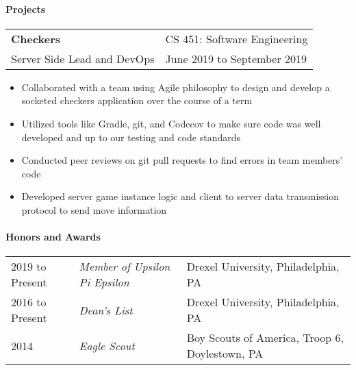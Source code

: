 \documentclass[9pt,]{article}
\let\oldparagraph\paragraph
\renewcommand{\paragraph}[1]{\oldparagraph{#1}\mbox{}}
\begin{document}
\hypertarget{projects}{%
	\paragraph{Projects}\label{projects}}

\begin{tabularx}{\textwidth}{l X}
	\textbf{Checkers} & \hfill CS 451: Software Engineering\\
	Server Side Lead and DevOps        & \hfill June 2019 to September 2019
\end{tabularx}

\begin{itemize}
	\setlength\itemsep{-0.75em}
	\item Collaborated with a team using Agile philosophy to design and develop a socketed checkers application over the course of a term
	\item Utilized tools like Gradle, git, and Codecov to make sure code was well developed and up to our testing and code standards
	\item Conducted peer reviews on git pull requests to find errors in team members' code
	\item Developed server game instance logic and client to server data transmission protocol to send move information
\end{itemize}


\hypertarget{honors-and-awards}{%
\paragraph{Honors and Awards}\label{honors-and-awards}}

\begin{tabularx}{\textwidth}{l | l X}
	2019 to Present & \textit{Member of Upsilon Pi Epsilon} & \hfill Drexel University, Philadelphia, PA\\
	2016 to Present &  \textit{Dean's List} & \hfill Drexel University, Philadelphia, PA\\
	2014         & \textit{Eagle Scout} & \hfill Boy Scouts of America, Troop 6, Doylestown, PA\\
\end{tabularx}

%
\end{document}
